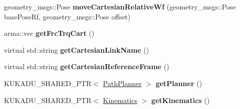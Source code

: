 \begin{DoxyCompactItemize}
\item 
geometry\+\_\+msgs\+::\+Pose {\bfseries move\+Cartesian\+Relative\+Wf} (geometry\+\_\+msgs\+::\+Pose base\+Pose\+Rf, geometry\+\_\+msgs\+::\+Pose offset)\hypertarget{classkukadu_1_1KukieControlQueue_ad0964c0cbfc3a44b7544396d5b9d0cba}{}\label{classkukadu_1_1KukieControlQueue_ad0964c0cbfc3a44b7544396d5b9d0cba}

\item 
arma\+::vec {\bfseries get\+Frc\+Trq\+Cart} ()\hypertarget{classkukadu_1_1KukieControlQueue_ab6563d18842c941f87ae942c983e47bd}{}\label{classkukadu_1_1KukieControlQueue_ab6563d18842c941f87ae942c983e47bd}

\item 
virtual std\+::string {\bfseries get\+Cartesian\+Link\+Name} ()\hypertarget{classkukadu_1_1KukieControlQueue_a0aa7d4a0ea5f73f4de129ca79dfbec2a}{}\label{classkukadu_1_1KukieControlQueue_a0aa7d4a0ea5f73f4de129ca79dfbec2a}

\item 
virtual std\+::string {\bfseries get\+Cartesian\+Reference\+Frame} ()\hypertarget{classkukadu_1_1KukieControlQueue_a92e3abdf0c3fba047d9f7fe32ccd6097}{}\label{classkukadu_1_1KukieControlQueue_a92e3abdf0c3fba047d9f7fe32ccd6097}

\item 
K\+U\+K\+A\+D\+U\+\_\+\+S\+H\+A\+R\+E\+D\+\_\+\+P\+TR$<$ \hyperlink{classkukadu_1_1PathPlanner}{Path\+Planner} $>$ {\bfseries get\+Planner} ()\hypertarget{classkukadu_1_1KukieControlQueue_abbb48ae5adf3cfdcd7baf3cade4bc751}{}\label{classkukadu_1_1KukieControlQueue_abbb48ae5adf3cfdcd7baf3cade4bc751}

\item 
K\+U\+K\+A\+D\+U\+\_\+\+S\+H\+A\+R\+E\+D\+\_\+\+P\+TR$<$ \hyperlink{classkukadu_1_1Kinematics}{Kinematics} $>$ {\bfseries get\+Kinematics} ()\hypertarget{classkukadu_1_1KukieControlQueue_aeab6a219bc62aca73cdbac872a8aad7c}{}\label{classkukadu_1_1KukieControlQueue_aeab6a219bc62aca73cdbac872a8aad7c}

\end{DoxyCompactItemize}
